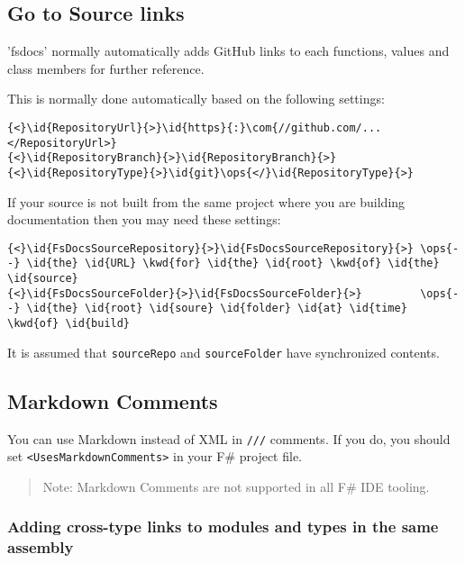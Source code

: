 \documentclass{article}
\newcommand{\id}[1]{\textcolor{black}{#1}}
\newcommand{\com}[1]{\textcolor{officegreen}{#1}}
\newcommand{\kwd}[1]{\textcolor{navy}{#1}}
\newcommand{\ops}[1]{\textcolor{purple}{#1}}
\begin{document}
\subsection*{Go to Source links}



'fsdocs' normally automatically adds GitHub links to each functions, values and class members for further reference.


This is normally done automatically based on the following settings:
\begin{Verbatim}[commandchars=\\\{\}]
{<}\id{RepositoryUrl}{>}\id{https}{:}\com{//github.com/...</RepositoryUrl>}
{<}\id{RepositoryBranch}{>}\id{RepositoryBranch}{>}
{<}\id{RepositoryType}{>}\id{git}\ops{</}\id{RepositoryType}{>}

\end{Verbatim}



If your source is not built from the same project where you are building documentation then
you may need these settings:
\begin{Verbatim}[commandchars=\\\{\}]
{<}\id{FsDocsSourceRepository}{>}\id{FsDocsSourceRepository}{>} \ops{--} \id{the} \id{URL} \kwd{for} \id{the} \id{root} \kwd{of} \id{the} \id{source} 
{<}\id{FsDocsSourceFolder}{>}\id{FsDocsSourceFolder}{>}         \ops{--} \id{the} \id{root} \id{soure} \id{folder} \id{at} \id{time} \kwd{of} \id{build}

\end{Verbatim}



It is assumed that \texttt{sourceRepo} and \texttt{sourceFolder} have synchronized contents.
\subsection*{Markdown Comments}



You can use Markdown instead of XML in \texttt{///} comments. If you do, you should set \texttt{<UsesMarkdownComments>} in
your F\# project file.
\begin{quote}


Note: Markdown Comments are not supported in all F\# IDE tooling.
\end{quote}

\subsubsection*{Adding cross-type links to modules and types in the same assembly}
\end{document}
